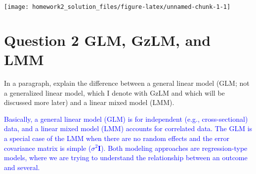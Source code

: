 \documentclass[
  12pt,
]{article}
\newenvironment{Shaded}{\begin{snugshade}}{\end{snugshade}}
\newcommand{\AttributeTok}[1]{\textcolor[rgb]{0.77,0.63,0.00}{#1}}
\newcommand{\CommentTok}[1]{\textcolor[rgb]{0.56,0.35,0.01}{\textit{#1}}}
\newcommand{\DecValTok}[1]{\textcolor[rgb]{0.00,0.00,0.81}{#1}}
\newcommand{\FloatTok}[1]{\textcolor[rgb]{0.00,0.00,0.81}{#1}}
\newcommand{\FunctionTok}[1]{\textcolor[rgb]{0.00,0.00,0.00}{#1}}
\newcommand{\NormalTok}[1]{#1}
\newcommand{\OtherTok}[1]{\textcolor[rgb]{0.56,0.35,0.01}{#1}}
\newcommand{\SpecialCharTok}[1]{\textcolor[rgb]{0.00,0.00,0.00}{#1}}
\newcommand{\StringTok}[1]{\textcolor[rgb]{0.31,0.60,0.02}{#1}}
\begin{document}
\begin{Shaded}
\end{Shaded}

\begin{center}\texttt{[image: homework2\_solution\_files/figure-latex/unnamed-chunk-1-1]} \end{center}

\newpage

\hypertarget{question-2-glm-gzlm-and-lmm}{%
\section{Question 2 GLM, GzLM, and
LMM}\label{question-2-glm-gzlm-and-lmm}}

In a paragraph, explain the difference between a general linear model
(GLM; not a generalized linear model, which I denote with GzLM and which
will be discussed more later) and a linear mixed model (LMM).

\textcolor{blue}{Basically, a general linear model (GLM) is for independent (e.g., cross-sectional) data, and a linear mixed model (LMM) accounts for correlated data. The GLM is a special case of the LMM when there are no random effects and the error covariance matrix is simple ($\sigma^2 \pmb I$). Both modeling approaches are regression-type models, where we are trying to understand the relationship between an outcome and several.}
\end{document}
